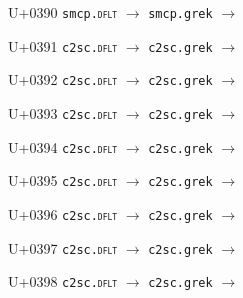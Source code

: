 \documentclass{article}
\begin{document}
\begin{substitutions}
\goodbreak

U+0390  \linebreak
    \texttt{smcp.\textsc{dflt}} $\to$  \linebreak
    \texttt{smcp.grek} $\to$  

\goodbreak

U+0391  \linebreak
    \texttt{c2sc.\textsc{dflt}} $\to$  \linebreak
    \texttt{c2sc.grek} $\to$  

\goodbreak

U+0392  \linebreak
    \texttt{c2sc.\textsc{dflt}} $\to$  \linebreak
    \texttt{c2sc.grek} $\to$  

\goodbreak

U+0393  \linebreak
    \texttt{c2sc.\textsc{dflt}} $\to$  \linebreak
    \texttt{c2sc.grek} $\to$  

\goodbreak

U+0394  \linebreak
    \texttt{c2sc.\textsc{dflt}} $\to$  \linebreak
    \texttt{c2sc.grek} $\to$  

\goodbreak

U+0395  \linebreak
    \texttt{c2sc.\textsc{dflt}} $\to$  \linebreak
    \texttt{c2sc.grek} $\to$  

\goodbreak

U+0396  \linebreak
    \texttt{c2sc.\textsc{dflt}} $\to$  \linebreak
    \texttt{c2sc.grek} $\to$  

\goodbreak

U+0397  \linebreak
    \texttt{c2sc.\textsc{dflt}} $\to$  \linebreak
    \texttt{c2sc.grek} $\to$  

\goodbreak

U+0398  \linebreak
    \texttt{c2sc.\textsc{dflt}} $\to$  \linebreak
    \texttt{c2sc.grek} $\to$  


\end{substitutions}
\end{document}
